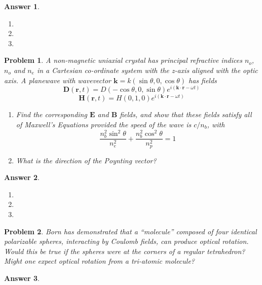 \documentclass[a4paper]{article}
\newtheorem{ans}{Answer}[section]
\theoremstyle{new}
\newtheorem{qns}{Problem}[section]
\begin{document}
\begin{ans}\leavevmode
\begin{enumerate}[label=(\alph*)]
\item 

\item 

\item 

\end{enumerate}
\end{ans}
\newpage
\begin{qns}
A non-magnetic uniaxial crystal has principal refractive indices $n_o$, $n_o$ and $n_e$ in a Cartesian co-ordinate system with the z-axis aligned with the optic axis. A planewave with wavevector $\mathbf{k} = k(\sin\theta, 0, \cos \theta)$ has fields
$$\mathbf{D}(\mathbf{r},t)=D(-\cos\theta,0,\sin\theta)e^{i(\mathbf{k}\cdot\mathbf{r}-\omega t)}$$
$$\mathbf{H}(\mathbf{r},t)=H(0,1,0)e^{i(\mathbf{k}\cdot\mathbf{r}-\omega t)}$$
\begin{enumerate}[label=(\alph*)]
\item Find the corresponding $\mathbf{E}$ and $\mathbf{B}$ fields, and show that these fields satisfy all of Maxwell’s Equations provided the speed of the wave is $c/n_b$, with
$$\frac{n_b^2\sin^2\theta}{n_e^2}+\frac{n_b^2\cos^2\theta}{n_p^2}=1$$
\item What is the direction of the Poynting vector?
\end{enumerate}
\end{qns}
\begin{ans}\leavevmode
\begin{enumerate}[label=(\alph*)]
\item 

\item 

\item 

\end{enumerate}
\end{ans}
\begin{qns}
Born has demonstrated that a “molecule” composed of four identical polarizable spheres, interacting by Coulomb fields, can produce optical rotation. Would this be true if the spheres were at the corners of a regular tetrahedron? Might one expect optical rotation from a tri-atomic molecule?
\end{qns}
\begin{ans}

\end{ans}
\newpage
\end{document}
